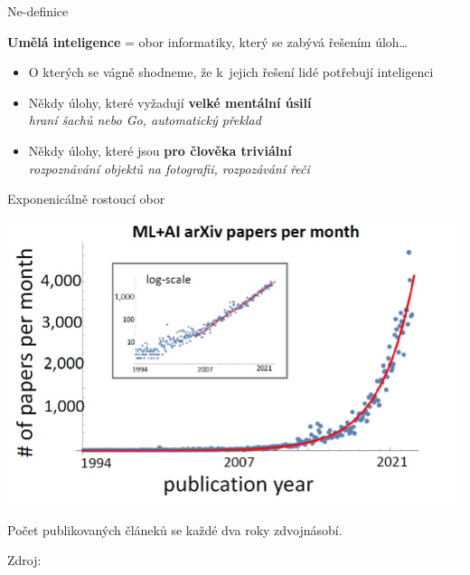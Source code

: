 \documentclass[handout,aspectratio=169,dvipsnames]{beamer}
\begin{document}
\begin{frame}{Ne-definice}

    \begin{center}
        \Large
    \textbf{Umělá inteligence} = obor informatiky, který se zabývá řešením
    úloh\ldots
    \end{center}

    \vspace{10pt}

    \begin{itemize}

        \item<2-> O kterých se vágně shodneme, že k~jejich řešení lidé potřebují
            inteligenci

        \item<3-> Někdy úlohy, které vyžadují \textbf{velké mentální úsilí} \\
            \quad \emph{hraní šachů nebo Go, automatický překlad}

        \item<4-> Někdy úlohy, které jsou \textbf{pro člověka triviální} \\
            \quad \emph{rozpoznávání objektů na fotografii, rozpozávání řeči}

    \end{itemize}

    \centering\vspace{15pt}


\end{frame}


\begin{frame}{Exponenicálně rostoucí obor}

    \centering
    \includegraphics[scale=.25]{./img/exp_growth.jpg}

    Počet publikovaných článeků se každé dva roky zdvojnásobí.

    {\footnotesize Zdroj: \citet{krenn2022prediction}}

\end{frame}
\end{document}
